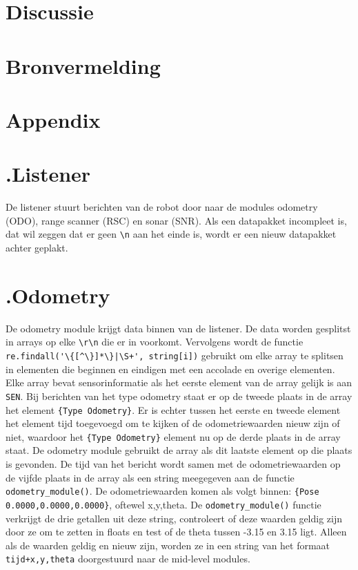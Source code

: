 \documentclass[a4paper,10pt]{article}
\begin{document}
\section{Discussie}
\section{Bronvermelding}
\newpage
\section{Appendix}
\appendix
\section*{\label{listener}\thesection.\quad Listener}
De listener stuurt berichten van de robot door naar de modules odometry (ODO), range scanner (RSC) en sonar (SNR). Als een datapakket incompleet is, dat wil zeggen dat er geen \verb!\n! aan het einde is, wordt er een nieuw datapakket achter geplakt.

\section*{\label{odometry}\thesection.\quad Odometry}
De odometry module krijgt data binnen van de listener. De data worden gesplitst in arrays op elke \verb!\r\n! die er in voorkomt. Vervolgens wordt de functie \verb!re.findall('\{[^\}]*\}|\S+', string[i])! gebruikt om elke array te splitsen in elementen die beginnen en eindigen met een accolade en overige elementen. Elke array bevat sensorinformatie als het eerste element van de array gelijk is aan \verb!SEN!. Bij berichten van het type odometry staat er op de tweede plaats in de array het element \verb!{Type Odometry}!. Er is echter tussen het eerste en tweede element het element tijd toegevoegd om te kijken of de odometriewaarden nieuw zijn of niet, waardoor het \verb!{Type Odometry}! element nu op de derde plaats in de array staat. De odometry module gebruikt de array als dit laatste element op die plaats is gevonden. De tijd van het bericht wordt samen met de odometriewaarden op de vijfde plaats in de array als een string meegegeven aan de functie \verb!odometry_module()!. De odometriewaarden komen als volgt binnen: \verb!{Pose 0.0000,0.0000,0.0000}!, oftewel x,y,theta. De \verb!odometry_module()! functie verkrijgt de drie getallen uit deze string, controleert of deze waarden geldig zijn door ze om te zetten in floats en test of de theta tussen -3.15 en 3.15 ligt. Alleen als de waarden geldig en nieuw zijn, worden ze in een string van het formaat \verb!tijd+x,y,theta! doorgestuurd naar de mid-level modules.
\end{document}
